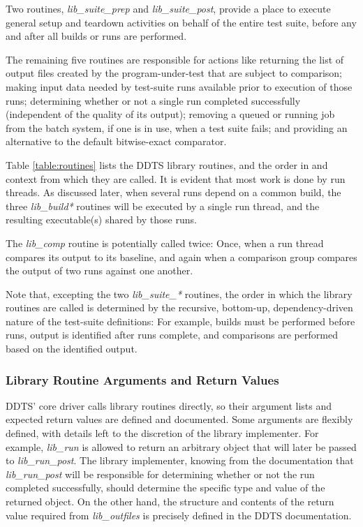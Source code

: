 \documentclass[conference]{IEEEtran}
\begin{document}
Two routines, \emph{lib\_suite\_prep} and \emph{lib\_suite\_post}, provide a place to execute general setup and teardown activities on behalf of the entire test suite, before any and after all builds or runs are performed.

The remaining five routines are responsible for actions like returning the list of output files created by the program-under-test that are subject to comparison; making input data needed by test-suite runs available prior to execution of those runs; determining whether or not a single run completed successfully (independent of the quality of its output); removing a queued or running job from the batch system, if one is in use, when a test suite fails; and providing an alternative to the default bitwise-exact comparator.

Table \ref{table:routines} lists the DDTS library routines, and the order in and context from which they are called. It is evident that most work is done by run threads. As discussed later, when several runs depend on a common build, the three \emph{lib\_build*} routines will be executed by a single run thread, and the resulting executable(s) shared by those runs.

The \emph{lib\_comp} routine is potentially called twice: Once, when a run thread compares its output to its baseline, and again when a comparison group compares the output of two runs against one another.

Note that, excepting the two \emph{lib\_suite\_*} routines, the order in which the library routines are called is determined by the recursive, bottom-up, dependency-driven nature of the test-suite definitions: For example, builds must be performed before runs, output is identified after runs complete, and comparisons are performed based on the identified output.

\subsubsection{Library Routine Arguments and Return Values}

DDTS' core driver calls library routines directly, so their argument lists and expected return values are defined and documented. Some arguments are flexibly defined, with details left to the discretion of the library implementer. For example, \emph{lib\_run} is allowed to return an arbitrary object that will later be passed to \emph{lib\_run\_post}. The library implementer, knowing from the documentation that \emph{lib\_run\_post} will be responsible for determining whether or not the run completed successfully, should determine the specific type and value of the returned object. On the other hand, the structure and contents of the return value required from \emph{lib\_outfiles} is precisely defined in the DDTS documentation.
\end{document}

